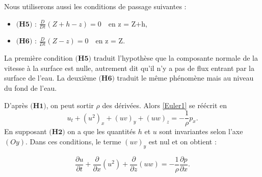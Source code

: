 \documentclass[
11pt, %
francais, %
singlespacing, %
headsepline, %
]{MastersDoctoralThesis} %
\theoremstyle{definition}
\begin{document}
Nous utiliserons aussi les conditions de passage suivantes :

\begin{itemize}
\item $\textbf{(H5)}$ : $\frac{D}{Dt} (Z+h-z) = 0 \quad \text{en z = Z+h}$,
\item $\textbf{(H6)}$ : $\frac{D}{Dt} (Z-z) = 0 \quad \text{en z = Z}$.
\end{itemize}

La première condition $\textbf{(H5)}$ traduit l'hypothèse que la composante normale de la vitesse à la surface est nulle, autrement dit qu'il n'y a pas de flux entrant par la surface de l'eau. La deuxième $\textbf{(H6)}$ traduit le même phénomène mais au niveau du fond de l'eau.

D'après $\textbf{(H1)}$, on peut sortir $\rho$ des dérivées. Alors \eqref{Euler1} se réécrit en 
\begin{equation} u_{t} + (u^{2})_{x}+(uv)_{y}+(uw)_{z} =-\frac{1}{\rho}p_{x}. \label{dvpt2}\end{equation}
En supposant  $\textbf{(H2)}$ on a que les quantités $h$ et $u$ sont invariantes selon l'axe $(Oy)$. Dans ces conditions, le terme $(uv)_{y}$ est nul et on obtient :




\begin{equation}
\frac{\partial u}{\partial t}+\frac{\partial}{\partial x} (u^{2})+\frac{\partial }{\partial z}(uw)=-\frac{1}{\rho}\frac{\partial p}{\partial x}.
\end{equation}
\end{document}
